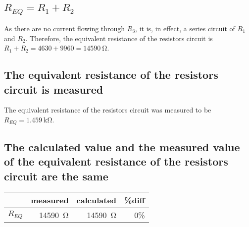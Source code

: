 \documentclass{article}
\begin{document}
\subsection{$R_{EQ} = R_1+R_2$ }
As there are no current flowing through $R_3$, it is, in effect, a series circuit of $R_1$ and $R_2$. Therefore, the equivalent resistance of the resistors circuit is $R_1+R_2 = 4630+9960=\SI{14590}{\ohm}$.
 
\subsection{The equivalent resistance of the resistors circuit is measured}
The equivalent resistance of the resistors circuit was measured to be $R_{EQ}=\SI{1.459}{\kilo\ohm}$.

\subsection{The calculated value and the measured value of the equivalent resistance of the resistors circuit are the same}
\begin{table}[H]
\centering
    \begin{tabular}{@{} l r r r@{}}
         \toprule
         &measured & calculated & \%diff  \\
         \midrule
         $R_{EQ}$ &\SI{14590}{\ohm} & \SI{14590}{\ohm} & 0\% \\
         \bottomrule
    \end{tabular}
\end{table}
\end{document}
